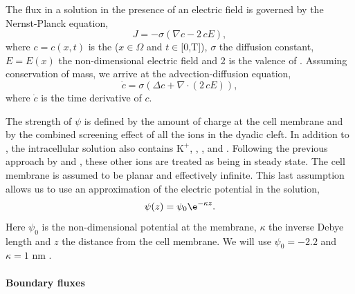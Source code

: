 The \Ca flux in a solution in the presence of an electric field is
governed by the Nernst-Planck equation,
\begin{equation}
  \label{eq:hake:nernst-planck}
  J = -\sigma\left(\nabla c-2\,cE\right),
\end{equation}
where $c = c(x,t)$ is the \CaC ($x\in\Omega$ and $t\in$[0,T]),
$\sigma$ the diffusion constant, $E = E(x)$ the non-dimensional
electric field and 2 is the valence of \Ca. Assuming conservation of
mass, we arrive at the advection-diffusion equation,
\begin{equation}
  \label{eq:hake:advection-diffusion}
  \dot{c}=\sigma\left(\Delta c + \nabla\cdot\left(2\,cE\right)\right),
\end{equation}
where $\dot{c}$ is the time derivative of $c$.\par

The strength of $\psi$ is defined by the amount of charge at the cell
membrane and by the combined screening effect of all the ions in the
dyadic cleft. In addition to \Ca, the intracellular solution also
contains \ensuremath{\mbox{K}^{+}}, \Na, \Cl, and \Mg. Following the
previous approach by \citet{LangnerCafisoMarceljaEtAl1990} and
\citet{SoellerCannell1997}, these other ions are treated as being in
steady state. The cell membrane is assumed to be planar and
effectively infinite. This last assumption allows us to use an
approximation of the electric potential in the solution,
\begin{equation}
  \label{eq:hake:electric_potential}
  \psi(z) = \psi_0\e^{-\kappa{}z}.
\end{equation}
Here $\psi_0$ is the non-dimensional potential at the membrane,
$\kappa$ the inverse Debye length and $z$ the distance from the cell
membrane. We will use $\psi_0=-2.2$ and $\kappa=1$ nm
\cite{SoellerCannell1997}.\par

\paragraph*{Boundary fluxes}

